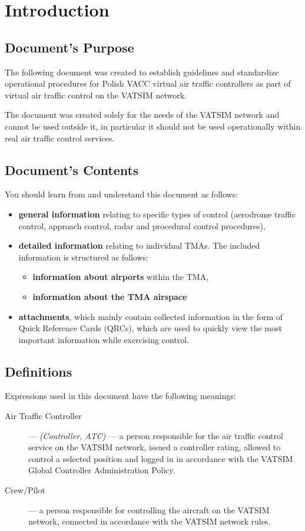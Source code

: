 \chapter{Introduction}%
\label{ch:introduction}
\section{Document's Purpose}
The following document was created to establish guidelines and standardize operational procedures for Polish VACC virtual air traffic controllers as part of virtual air traffic control on the VATSIM network.

The document was created solely for the needs of the VATSIM network and cannot be used outside it, in particular it should not be used operationally within real air traffic control services.

\section{Document's Contents}
You should learn from and understand this document as follows:
\begin{itemize}
\item \textbf{general information} relating to specific types of control (aerodrome traffic control, approach control, radar and procedural control procedures),
\item \textbf{detailed information} relating to individual TMAs. The included information is structured as follows:
\begin{itemize}
\item \textbf{information about airports} within the TMA,
\item \textbf{information about the TMA airspace}
\end{itemize}
\item \textbf{attachments}, which mainly contain collected information in the form of Quick Reference Cards (QRCs), which are used to quickly view the most important information while exercising control.
\end{itemize}

\section{Definitions}
Expressions used in this document have the following meanings:
\begin{description}
    \item[Air Traffic Controller] --- \textit{(Controller, ATC)} --- a person responsible for the air traffic control service on the VATSIM network, issued a controller rating, allowed to control a selected position and logged in in accordance with the VATSIM Global Controller Administration Policy.
    \item[Crew/Pilot] --- a person responsible for controlling the aircraft on the VATSIM network, connected in accordance with the VATSIM network rules.
\end{description}

